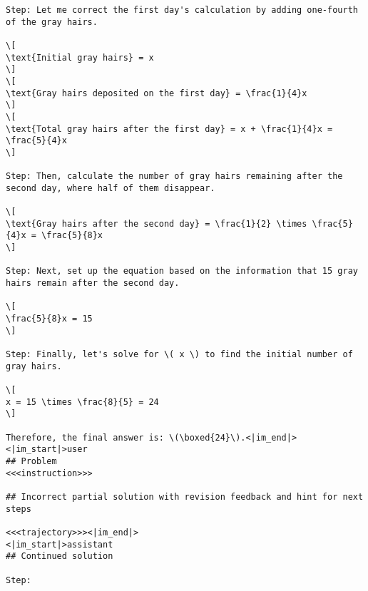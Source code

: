 \begin{tcolorbox}[brown_box, title = {{Prompt Template 1.2.2 --- Generator generates continuations for incorrect partial solutions}}]
\begin{verbatim}
Step: Let me correct the first day's calculation by adding one-fourth of the gray hairs.

\[
\text{Initial gray hairs} = x
\]
\[
\text{Gray hairs deposited on the first day} = \frac{1}{4}x
\]
\[
\text{Total gray hairs after the first day} = x + \frac{1}{4}x = \frac{5}{4}x
\]

Step: Then, calculate the number of gray hairs remaining after the second day, where half of them disappear.

\[
\text{Gray hairs after the second day} = \frac{1}{2} \times \frac{5}{4}x = \frac{5}{8}x
\]

Step: Next, set up the equation based on the information that 15 gray hairs remain after the second day.

\[
\frac{5}{8}x = 15
\]

Step: Finally, let's solve for \( x \) to find the initial number of gray hairs.

\[
x = 15 \times \frac{8}{5} = 24
\]

Therefore, the final answer is: \(\boxed{24}\).<|im_end|>
<|im_start|>user
## Problem
<<<instruction>>>

## Incorrect partial solution with revision feedback and hint for next steps

<<<trajectory>>><|im_end|>
<|im_start|>assistant
## Continued solution

Step:
\end{verbatim}
\end{tcolorbox}